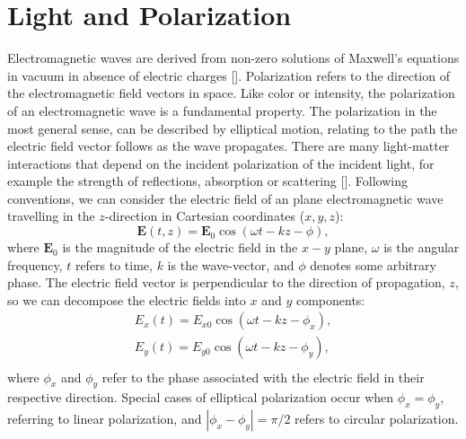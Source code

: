 \section{Light and Polarization}
Electromagnetic waves are derived from non-zero solutions of Maxwell’s equations in vacuum in absence of electric charges [\cite{jackson, Landau}]. Polarization refers to the direction of the electromagnetic field vectors in space. Like color or intensity, the polarization of an electromagnetic wave is a fundamental property. The polarization in the most general sense, can be described by elliptical motion, relating to the path the electric field vector follows as the wave propagates. There are many light-matter interactions that depend on the incident polarization of the incident light, for example the strength of reflections, absorption or scattering [\cite{Hulst}]. Following conventions, we can consider the electric field of an plane electromagnetic wave travelling in the $z$-direction in Cartesian coordinates ($x,y,z$):
\begin{equation}
\mathbf{E}(t, z) =\mathbf{E}_0 \cos(\omega t-kz-\phi),
\end{equation}where $\mathbf{E}_0$ is the magnitude of the electric field in the $x-y$ plane, $\omega$ is the angular frequency, $t$ refers to time, $k$ is the wave-vector, and $\phi$ denotes some arbitrary phase. The electric field vector is perpendicular to the direction of propagation, $z$, so we can decompose the electric fields into $x$ and $y$ components:
\begin{equation}
\begin{aligned}
E_x(t) = E_{x0} \cos(\omega t-kz-\phi_x),\\
E_y(t) = E_{y0} \cos(\omega t-kz-\phi_y),\\
\end{aligned}
\end{equation}
where $\phi_x$ and $\phi_y$ refer to the phase associated with the electric field in their respective direction. Special cases of elliptical polarization occur when $\phi_x = \phi_y$, referring to linear polarization, and $|\phi_x-\phi_y| = \pi/2$ refers to circular polarization.

